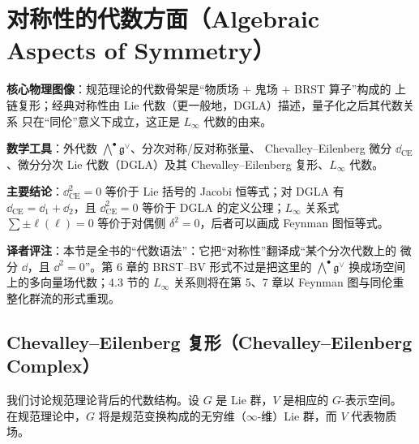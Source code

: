 
\section{对称性的代数方面（Algebraic Aspects of Symmetry）}

\begin{keypoints}
  \item \textbf{核心物理图像}：规范理论的代数骨架是“物质场 $+$ 鬼场 $+$ BRST 算子”构成的
        上链复形；经典对称性由 Lie 代数（更一般地，DGLA）描述，量子化之后其代数关系
        只在“同伦”意义下成立，这正是 $L_\infty$ 代数的由来。
  \item \textbf{数学工具}：外代数 $\bigwedge^{\bullet}\mathfrak g^{\vee}$、分次对称/反对称张量、
        Chevalley--Eilenberg 微分 $\dd_{\mathrm{CE}}$、微分分次 Lie 代数（DGLA）及其
        Chevalley--Eilenberg 复形、$L_\infty$ 代数。
  \item \textbf{主要结论}：$\dd_{\mathrm{CE}}^2=0$ 等价于 Lie 括号的 Jacobi 恒等式；对 DGLA 有
        $\dd_{\mathrm{CE}}=\dd_1+\dd_2$，且 $\dd_{\mathrm{CE}}^2=0$ 等价于 DGLA 的定义公理；$L_\infty$
        关系式 $\sum\pm\ell(\ell)=0$ 等价于对偶侧 $\delta^2=0$，后者可以画成 Feynman 图恒等式。
  \item \textbf{译者评注}：本节是全书的“代数语法”：它把“对称性”翻译成“某个分次代数上的
        微分 $\dd$，且 $\dd^2=0$”。第 6 章的 BRST--BV 形式不过是把这里的
        $\bigwedge^{\bullet}\mathfrak g^{\vee}$ 换成场空间上的多向量场代数；4.3 节的
        $L_\infty$ 关系则将在第 5、7 章以 Feynman 图与同伦重整化群流的形式重现。
\end{keypoints}

\subsection{Chevalley--Eilenberg 复形（Chevalley--Eilenberg Complex）}

我们讨论规范理论背后的代数结构。设 $G$ 是 Lie 群，$V$ 是相应的 $G$-表示空间。
在规范理论中，$G$ 将是规范变换构成的无穷维（$\infty$-维）Lie 群，而 $V$ 代表物质场。

